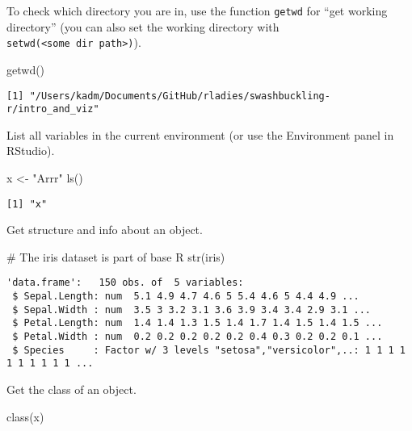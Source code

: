 \documentclass[
  letterpaper,
  DIV=11,
  numbers=noendperiod]{scrartcl}
\newenvironment{Shaded}{\begin{snugshade}}{\end{snugshade}}
\newcommand{\CommentTok}[1]{\textcolor[rgb]{0.37,0.37,0.37}{#1}}
\newcommand{\FunctionTok}[1]{\textcolor[rgb]{0.28,0.35,0.67}{#1}}
\newcommand{\NormalTok}[1]{\textcolor[rgb]{0.00,0.23,0.31}{#1}}
\newcommand{\OtherTok}[1]{\textcolor[rgb]{0.00,0.23,0.31}{#1}}
\newcommand{\StringTok}[1]{\textcolor[rgb]{0.13,0.47,0.30}{#1}}
\begin{document}
To check which directory you are in, use the function \texttt{getwd} for
``get working directory'' (you can also set the working directory with
\texttt{setwd(\textless{}some\ dir\ path\textgreater{})}).

\begin{Shaded}
\begin{Highlighting}[]
\FunctionTok{getwd}\NormalTok{()}
\end{Highlighting}
\end{Shaded}

\begin{verbatim}
[1] "/Users/kadm/Documents/GitHub/rladies/swashbuckling-r/intro_and_viz"
\end{verbatim}

List all variables in the current environment (or use the Environment
panel in RStudio).

\begin{Shaded}
\begin{Highlighting}[]
\NormalTok{x }\OtherTok{\textless{}{-}} \StringTok{"Arrr"}
\FunctionTok{ls}\NormalTok{()}
\end{Highlighting}
\end{Shaded}

\begin{verbatim}
[1] "x"
\end{verbatim}

Get structure and info about an object.

\begin{Shaded}
\begin{Highlighting}[]
\CommentTok{\# The iris dataset is part of base R}
\FunctionTok{str}\NormalTok{(iris)}
\end{Highlighting}
\end{Shaded}

\begin{verbatim}
'data.frame':   150 obs. of  5 variables:
 $ Sepal.Length: num  5.1 4.9 4.7 4.6 5 5.4 4.6 5 4.4 4.9 ...
 $ Sepal.Width : num  3.5 3 3.2 3.1 3.6 3.9 3.4 3.4 2.9 3.1 ...
 $ Petal.Length: num  1.4 1.4 1.3 1.5 1.4 1.7 1.4 1.5 1.4 1.5 ...
 $ Petal.Width : num  0.2 0.2 0.2 0.2 0.2 0.4 0.3 0.2 0.2 0.1 ...
 $ Species     : Factor w/ 3 levels "setosa","versicolor",..: 1 1 1 1 1 1 1 1 1 1 ...
\end{verbatim}

Get the class of an object.

\begin{Shaded}
\begin{Highlighting}[]
\FunctionTok{class}\NormalTok{(x)}
\end{Highlighting}
\end{Shaded}
\end{document}
